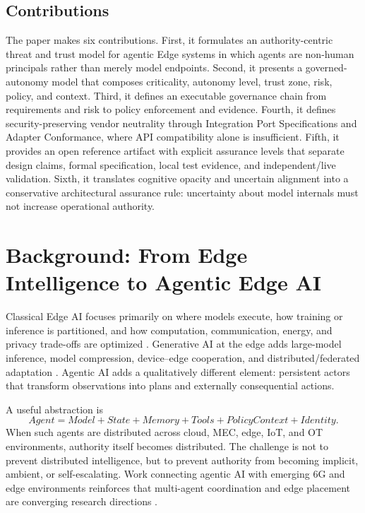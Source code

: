 \documentclass[11pt]{article}
\begin{document}
\subsection{Contributions}
The paper makes six contributions. First, it formulates an authority-centric threat and trust model for agentic Edge systems in which agents are non-human principals rather than merely model endpoints. Second, it presents a governed-autonomy model that composes criticality, autonomy level, trust zone, risk, policy, and context. Third, it defines an executable governance chain from requirements and risk to policy enforcement and evidence. Fourth, it defines security-preserving vendor neutrality through Integration Port Specifications and Adapter Conformance, where API compatibility alone is insufficient. Fifth, it provides an open reference artifact with explicit assurance levels that separate design claims, formal specification, local test evidence, and independent/live validation. Sixth, it translates cognitive opacity and uncertain alignment into a conservative architectural assurance rule: uncertainty about model internals must not increase operational authority.

\section{Background: From Edge Intelligence to Agentic Edge AI}
Classical Edge AI focuses primarily on where models execute, how training or inference is partitioned, and how computation, communication, energy, and privacy trade-offs are optimized \cite{zhou2019edge,wang2025trustworthyedge}. Generative AI at the edge adds large-model inference, model compression, device--edge cooperation, and distributed/federated adaptation \cite{navardi2025genaiedge,wang2025edgeefficientllm,piccialli2025federatededge}. Agentic AI adds a qualitatively different element: persistent actors that transform observations into plans and externally consequential actions.

A useful abstraction is
\[
Agent = Model + State + Memory + Tools + PolicyContext + Identity.
\]
When such agents are distributed across cloud, MEC, edge, IoT, and OT environments, authority itself becomes distributed. The challenge is not to prevent distributed intelligence, but to prevent authority from becoming implicit, ambient, or self-escalating. Work connecting agentic AI with emerging 6G and edge environments reinforces that multi-agent coordination and edge placement are converging research directions \cite{ale2025agentic6g}.
\end{document}
